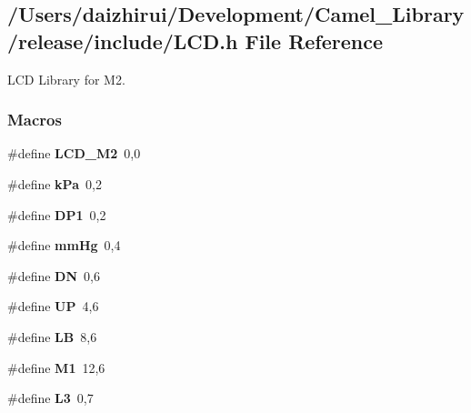 \hypertarget{a00017}{}\subsection{/\+Users/daizhirui/\+Development/\+Camel\+\_\+\+Library/release/include/\+L\+CD.h File Reference}
\label{a00017}


L\+CD Library for M2.  


\subsubsection*{Macros}
\begin{DoxyCompactItemize}
\item 
\mbox{\label{a00017_a4af5427d9aa90c7448319d8d671ed934}} 
\#define {\bfseries L\+C\+D\+\_\+\+M2}~0,0
\item 
\mbox{\label{a00017_a1af9bfb776e912a8ed058f35aec8de6f}} 
\#define {\bfseries k\+Pa}~0,2
\item 
\mbox{\label{a00017_a9619bed778bac3de065a9a15bfd70b02}} 
\#define {\bfseries D\+P1}~0,2
\item 
\mbox{\label{a00017_a8dea6b4b81cf2b2d63ad7c849a3e9e57}} 
\#define {\bfseries mm\+Hg}~0,4
\item 
\mbox{\label{a00017_ad6ebbc68b0071f082925e51e4f2bd9a8}} 
\#define {\bfseries DN}~0,6
\item 
\mbox{\label{a00017_a1965eaca47dbf3f87acdafc2208f04eb}} 
\#define {\bfseries UP}~4,6
\item 
\mbox{\label{a00017_acc55daa58d88a3612f2ef74a6abbe97f}} 
\#define {\bfseries LB}~8,6
\item 
\mbox{\label{a00017_ac597abe7cf610f262f7aaec53ed1d413}} 
\#define {\bfseries M1}~12,6
\item 
\mbox{\label{a00017_a7771a73a8014204aeeecaaf58527b670}} 
\#define {\bfseries L3}~0,7
\item 
\mbox{\label{a00017_a3ede60bb20906da26821f9d2e9ff549f}} 

\end{DoxyCompactItemize}
